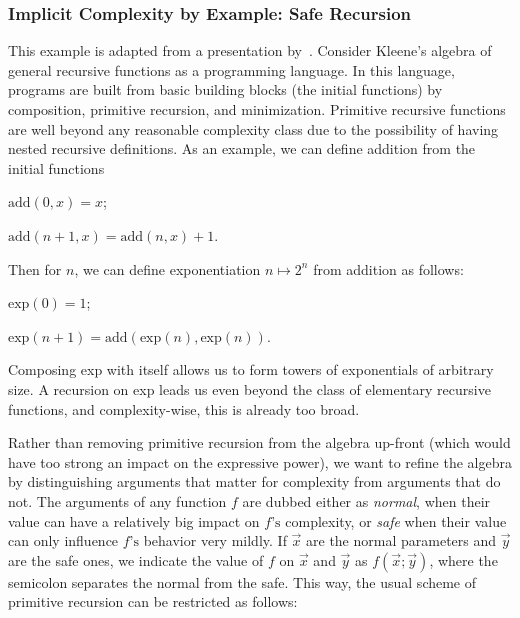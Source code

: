 \subsubsection{Implicit Complexity by Example: Safe Recursion}
\label{safe-rec}

This example is adapted from a presentation by~\textcite{dallago2022}. Consider
Kleene's algebra of general recursive
functions as a programming language. In this language,
programs are built from basic building blocks (the initial functions) by
composition, primitive recursion, and minimization.
Primitive recursive functions are
well beyond any reasonable complexity class
due to the possibility of having nested recursive definitions.
As an example, we can define addition from the initial functions

\begin{center}
\(\text{add}(0, x) = x\);

\(\text{add}(n + 1, x) = \text{add}(n, x) + 1\).
\end{center}

Then for \(n\), we can define exponentiation \(n \mapsto 2^n\) from
addition as follows:

\begin{center}
\(\text{exp}(0) = 1\);

\(\text{exp}(n + 1) = \text{add}(\text{exp}(n), \text{exp}(n))\).
\end{center}

\noindent Composing exp with itself allows us to form towers of exponentials of
arbitrary size. A recursion on exp leads us even beyond the class of elementary
recursive functions, and complexity-wise, this is
already too broad.

Rather than removing primitive recursion from the
algebra up-front (which would have too strong an impact on the expressive
power), we want to refine the algebra by distinguishing arguments that matter
for complexity from arguments that do not. The arguments of any function
\(f\) are dubbed either as \emph{normal}, when their value can have a
relatively big impact on \(f\text{'s}\) complexity, or \emph{safe} when
their value can only influence \(f\)\(\text{'s}\) behavior very mildly.
If \(\vec{x}\) are the normal parameters and
\(\vec{y}\) are the safe ones, we indicate the value of
\(f\) on \(\vec{x}\) and \(\vec{y}\) as
\(f(\vec{x};\vec{y})\), where the semicolon separates
the normal from the safe. This way, the usual scheme of primitive
recursion can be restricted as follows:

